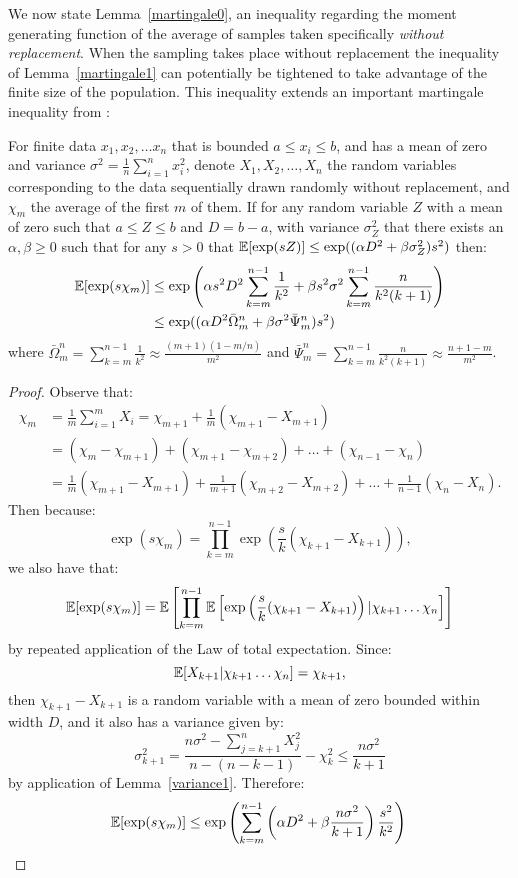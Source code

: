 We now state Lemma~\ref{martingale0}, an inequality regarding the moment generating function of the average of samples taken specifically \textit{without replacement}.
When the sampling takes place without replacement the inequality of Lemma~\ref{martingale1} can potentially be tightened to take advantage of the finite size of the population.
This inequality extends an important martingale inequality from \cite{bardenet2015}:

\begin{lemma}\label{martingale0}
For finite data $x_1,x_2,\dots x_n$ that is bounded $a\le x_i\le b$, and has a mean of zero and variance $\sigma^2=\frac{1}{n}\sum_{i=1}^nx_i^2$, denote $X_1,X_2,\dots,X_n$ the random variables corresponding to the data sequentially drawn randomly without replacement, and $\chi_m$ the average of the first $m$ of them.
If for any random variable $Z$ with a mean of zero such that $a\le Z\le b$ and $D=b-a$, with variance $\sigma_Z^2$ that there exists an $\alpha, \beta \ge 0$ such that for any $s>0$ that $\operatorname{\mathbb{E}}[\exp(sZ)]\le\exp((\alpha D^2 +\beta \sigma_Z^2) s^2)$ then:
\begin{align*}\operatorname{\mathbb{E}}[\exp(s\chi_m)]&\le\exp\left(\alpha s^2D^2\sum_{k=m}^{n-1}\frac{1}{k^2} +\beta s^2\sigma^2 \sum_{k=m}^{n-1}\frac{n}{k^2(k+1)}\right)\\ &\le \exp((\alpha D^2\bar{\Omega}_m^n +\beta\sigma^2 \bar{\Psi}_m^n)s^2)\end{align*}
where $\bar{\Omega}_m^n = \sum_{k=m}^{n-1}\frac{1}{k^2}\approx \frac{(m+1)(1-m/n)}{m^2}$ and $\bar{\Psi}_m^n = \sum_{k=m}^{n-1}\frac{n}{k^2(k+1)}\approx \frac{n+1-m}{m^2}$.
\end{lemma}
\begin{proof}
Observe that:
\begin{align*}
\chi_m 
& =\frac{1}{m}\sum_{i=1}^{m}X_i = \chi_{m+1}+\frac{1}{m}(\chi_{m+1}-X_{m+1})\\
& =(\chi_m-\chi_{m+1})+(\chi_{m+1}-\chi_{m+2}) + \dots + (\chi_{n-1}-\chi_n)\\
& =\frac{1}{m}(\chi_{m+1}-X_{m+1})+\frac{1}{m+1}(\chi_{m+2}-X_{m+2}) + \dots + \frac{1}{n-1}(\chi_n-X_n).
\end{align*} 
Then because:
$$\exp(s\chi_m)=\prod_{k=m}^{n-1}\exp\left(\frac{s}{k}(\chi_{k+1}-X_{k+1})\right),$$
we also have that: 
$$\operatorname{\mathbb{E}}[\exp(s\chi_m)]=\operatorname{\mathbb{E}}\left[\prod_{k=m}^{n-1}\operatorname{\mathbb{E}}\left[\exp\left(\frac{s}{k}(\chi_{k+1}-X_{k+1})\right)|\chi_{k+1}\dots \chi_n\right]\right]$$
by repeated application of the Law of total expectation. 
Since:
$$\operatorname{\mathbb{E}}[X_{k+1}|\chi_{k+1}\dots \chi_n]=\chi_{k+1},$$ 
then $\chi_{k+1}-X_{k+1}$ is a random variable with a mean of zero bounded within width $D$, and it also has a variance given by: 
\begin{equation}\label{approx1} 
\sigma_{k+1}^2 = \frac{n\sigma^2-\sum_{j=k+1}^nX_j^2}{n-(n-k-1)} - \chi_k^2 \le \frac{n\sigma^2}{k+1}
\end{equation}
by application of Lemma~\ref{variance1}. 
Therefore: 
\[\operatorname{\mathbb{E}}[\exp(s\chi_m)]\le\exp\left(\sum_{k=m}^{n-1}\left(\alpha D^2 +\beta \frac{n\sigma^2}{k+1}\right) \frac{s^2}{k^2}\right)\qedhere\]
\end{proof}


